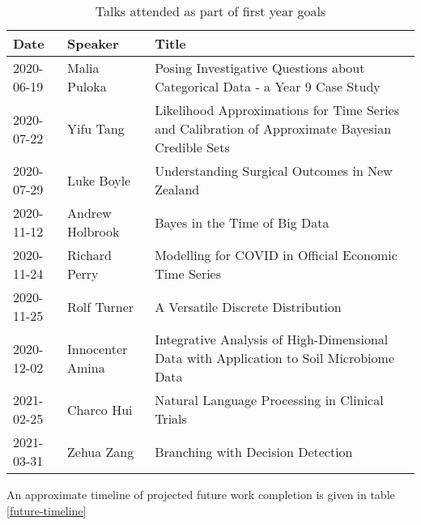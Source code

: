 \begin{table}[h]
        \centering
        \begin{tabularx}{\textwidth}{llX}
                \toprule
                Date & Speaker & Title\\
                \midrule
                2020-06-19 & Malia Puloka & Posing Investigative Questions about Categorical Data - a Year 9 Case Study\\
                2020-07-22 & Yifu Tang & Likelihood Approximations for Time Series and Calibration of Approximate Bayesian Credible Sets\\
                2020-07-29 & Luke Boyle & Understanding Surgical Outcomes in New Zealand\\
                2020-11-12 & Andrew Holbrook & Bayes in the Time of Big Data\\
                2020-11-24 & Richard Perry & Modelling for COVID in Official Economic Time Series\\
                2020-11-25 & Rolf Turner & A Versatile Discrete Distribution\\
                2020-12-02 & Innocenter Amina & Integrative Analysis of High-Dimensional Data with Application to Soil Microbiome Data\\
                2021-02-25 & Charco Hui & Natural Language Processing in Clinical Trials\\
                2021-03-31 & Zehua Zang & Branching with Decision Detection\\
                \bottomrule
        \end{tabularx}
        \caption{\label{talks}Talks attended as part of first year goals}
\end{table}

An approximate timeline of projected future work completion is given in table \ref{future-timeline}

